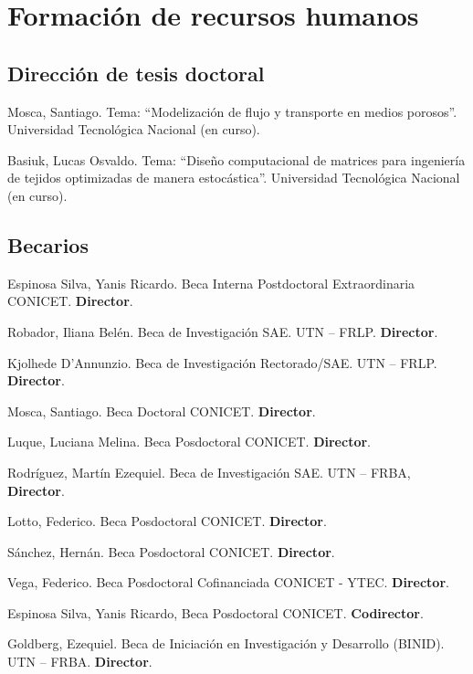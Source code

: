 \section{Formación de recursos humanos}

\subsection{Dirección de tesis doctoral}
 Mosca, Santiago. Tema: ``Modelización de flujo y transporte en medios porosos''. Universidad Tecnológica Nacional (en curso).

 Basiuk, Lucas Osvaldo. Tema: ``Diseño computacional de matrices para ingeniería de tejidos optimizadas de manera estocástica''. Universidad Tecnológica Nacional  (en curso).

\subsection{Becarios}

     Espinosa Silva, Yanis Ricardo. Beca Interna Postdoctoral Extraordinaria CONICET. \textbf{Director}.

     Robador, Iliana Belén. Beca de Investigación SAE. UTN -- FRLP. \textbf{Director}.

     Kjolhede D'Annunzio. Beca de Investigación Rectorado/SAE. UTN -- FRLP. \textbf{Director}.

     Mosca, Santiago. Beca Doctoral CONICET. \textbf{Director}.

     Luque, Luciana Melina. Beca Posdoctoral CONICET. \textbf{Director}.

     Rodríguez, Martín Ezequiel. Beca de Investigación SAE. UTN -- FRBA, \textbf{Director}.

     Lotto, Federico. Beca Posdoctoral CONICET. \textbf{Director}.

     Sánchez, Hernán. Beca Posdoctoral CONICET. \textbf{Director}.

     Vega, Federico. Beca Posdoctoral Cofinanciada CONICET - YTEC. \textbf{Director}.

     Espinosa Silva, Yanis Ricardo, Beca Posdoctoral CONICET. \textbf{Codirector}.

     Goldberg, Ezequiel. Beca de Iniciación en Investigación y Desarrollo (BINID). UTN -- FRBA. \textbf{Director}.

